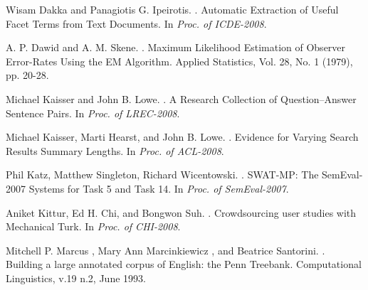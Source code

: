 \documentclass[11pt]{article}
\begin{document}
\begin{thebibliography}{}
Wisam Dakka and Panagiotis G. Ipeirotis.
.
\newblock Automatic Extraction of Useful Facet Terms from Text Documents.
\newblock In \textit{Proc. of ICDE-2008}.

A. P. Dawid and A. M. Skene.
.
\newblock Maximum Likelihood Estimation of Observer Error-Rates Using the EM Algorithm.
\newblock Applied Statistics, Vol. 28, No. 1 (1979), pp. 20-28.

%



Michael Kaisser and John B. Lowe. 
.
\newblock A Research Collection of Question–Answer Sentence Pairs.
\newblock In \textit{Proc. of LREC-2008}.

Michael Kaisser, Marti Hearst, and John B. Lowe. 
.
\newblock Evidence for Varying Search Results Summary Lengths. 
\newblock In \textit{Proc. of ACL-2008}.

Phil Katz, Matthew Singleton, Richard Wicentowski. 
.
\newblock SWAT-MP: The SemEval-2007 Systems for Task 5 and Task 14.
\newblock In \textit{ Proc. of SemEval-2007}.

Aniket Kittur, Ed H. Chi, and Bongwon Suh. 
.
\newblock Crowdsourcing user studies with Mechanical Turk. 
\newblock In \textit{ Proc. of CHI-2008}.

Mitchell P. Marcus , Mary Ann Marcinkiewicz , and Beatrice Santorini.
.
\newblock Building a large annotated corpus of English: the Penn Treebank.
\newblock Computational Linguistics, v.19 n.2, June 1993.


\end{thebibliography}
\end{document}
